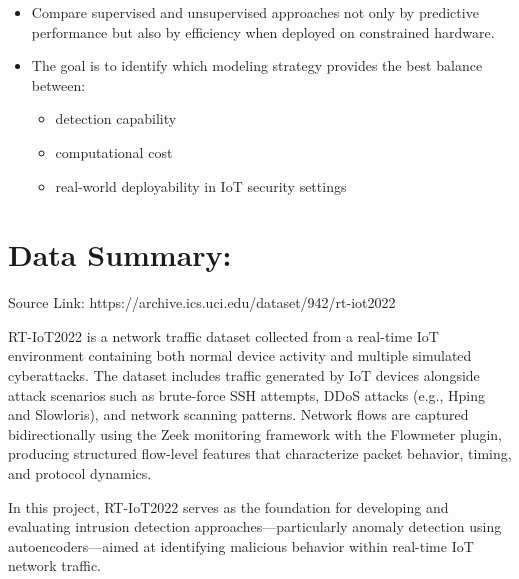 \documentclass[
  8pt,
  letterpaper,
  DIV=11,
  numbers=noendperiod]{scrreprt}
\begin{document}
\begin{enumerate}
  \begin{itemize}
  \item
    Compare supervised and unsupervised approaches not only by
    predictive performance but also by efficiency when deployed on
    constrained hardware.
  \item
    The goal is to identify which modeling strategy provides the best
    balance between:

    \begin{itemize}
    \item
      detection capability
    \item
      computational cost
    \item
      real-world deployability in IoT security settings
    \end{itemize}
  \end{itemize}
\end{enumerate}

\section{Data Summary:}\label{data-summary}

Source Link: https://archive.ics.uci.edu/dataset/942/rt-iot2022

RT-IoT2022 is a network traffic dataset collected from a real-time IoT
environment containing both normal device activity and multiple
simulated cyberattacks. The dataset includes traffic generated by IoT
devices alongside attack scenarios such as brute-force SSH attempts,
DDoS attacks (e.g., Hping and Slowloris), and network scanning patterns.
Network flows are captured bidirectionally using the Zeek monitoring
framework with the Flowmeter plugin, producing structured flow-level
features that characterize packet behavior, timing, and protocol
dynamics.

In this project, RT-IoT2022 serves as the foundation for developing and
evaluating intrusion detection approaches---particularly anomaly
detection using autoencoders---aimed at identifying malicious behavior
within real-time IoT network traffic.
\end{document}
